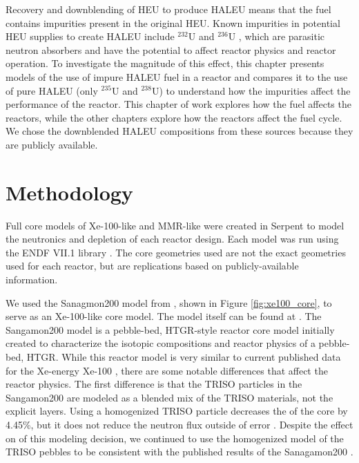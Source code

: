 Recovery and downblending of \gls{HEU} to produce \gls{HALEU} means that 
the fuel contains impurities present in the original
\gls{HEU}. Known impurities in potential \gls{HEU}
supplies to create \gls{HALEU} include $^{232}$U and $^{236}$U
\cite{vaden_isotopic_2018,nelson_foreign_2010},  
which are parasitic neutron absorbers and have the potential to affect 
reactor physics and reactor operation. To investigate the magnitude of this 
effect, this chapter presents models of the use of 
impure \gls{HALEU} fuel in a reactor and compares it to the use of pure 
\gls{HALEU} (only $^{235}$U and $^{238}$U)
to understand how the impurities affect the performance of the reactor.
This chapter of work explores how the fuel affects the reactors, while 
the other chapters explore how the reactors affect the fuel cycle. We chose 
the downblended \gls{HALEU} compositions from these sources because
they are publicly available. 

\section{Methodology}
Full core models of Xe-100-like and \gls{MMR}-like were created in Serpent 
\cite{leppanen_serpent_2014} to model the neutronics and depletion of 
each reactor design. Each model was run using the ENDF VII.1 library
\cite{chadwick_endfb-vii1_2011}. The core geometries used are not 
the exact geometries used for each reactor, but are replications based 
on publicly-available information. 

We used the Sanagmon200 model from \cite{richter_isotopic_2022}, shown in 
Figure \ref{fig:xe100_core}, to serve as an Xe-100-like 
core model. The model itself can be found at \cite{richter_zoerichterphlox_2022}.
The Sangamon200 model is a pebble-bed, \gls{HTGR}-style reactor core model 
initially created to characterize the isotopic compositions and 
reactor physics of a pebble-bed, \gls{HTGR}. While this reactor model 
is very similar to current published data for the Xe-energy Xe-100
\cite{mulder_overview_2021}, there are some notable differences that affect 
the reactor physics. The first difference is that the \gls{TRISO} particles 
in the Sangamon200 are modeled as a blended mix of the \gls{TRISO} 
materials, not the explicit layers. Using a homogenized \gls{TRISO} particle 
decreases the \keff of the core by 4.45\%, but it does not reduce the 
neutron flux outside of error \cite{richter_isotopic_2022}. Despite 
the effect on \keff of this modeling decision, we continued to use the 
homogenized model of the \gls{TRISO} pebbles to be consistent with the 
published results of the Sanagamon200 \cite{richter_isotopic_2022}. 

